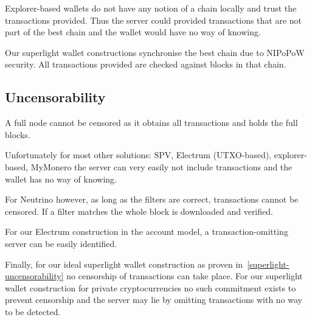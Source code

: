 Explorer-based wallets do not have any notion of a chain locally and trust the transactions provided. Thus the server could provided transactions that are not part of the best chain and the wallet would have no way of knowing.

Our superlight wallet constructions synchronise the best chain due to NIPoPoW security. All transactions provided are checked against blocks in that chain.


\subsection{Uncensorability}
A full node cannot be censored as it obtains all transactions and holds the full blocks.

Unfortunately for most other solutions: SPV, Electrum (UTXO-based), explorer-based, MyMonero the server can very easily not include transactions and the wallet has no way of knowing.

For Neutrino however, as long as the filters are correct, transactions cannot be censored. If a filter matches the whole block is downloaded and verified.

For our Electrum construction in the account model, a transaction-omitting server can be easily identified.

Finally, for our ideal superlight wallet construction as proven in~\cref{superlight-uncensorability} no censorship of transactions can take place.
For our superlight wallet construction for private cryptocurrencies no such commitment exists to prevent censorship and the server may lie by omitting transactions with no way to be detected.
